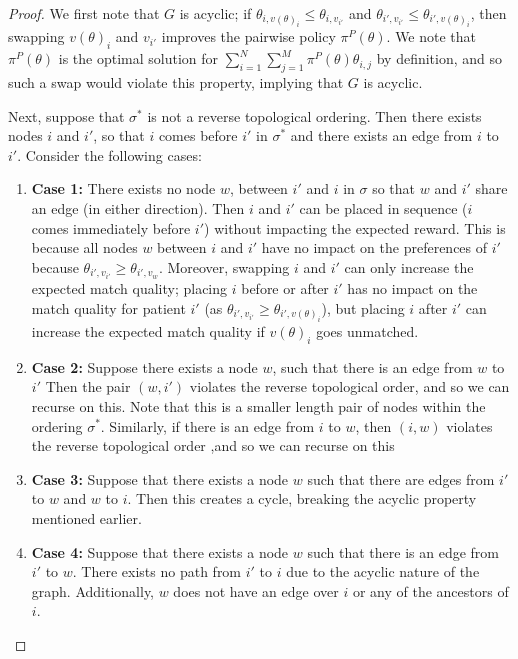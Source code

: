 \documentclass[11pt]{article}
\begin{document}
\thmordering*
\begin{proof}
We first note that $G$ is acyclic; if $\theta_{i,v(\theta)_{i}} \leq \theta_{i,v_{i'}}$ and $\theta_{i',v_{i'}} \leq \theta_{i',v(\theta)_{i}}$, then swapping $v(\theta)_{i}$ and $v_{i'}$ improves the pairwise policy $\pi^{P}(\theta)$. 
We note that $\pi^{P}(\theta)$ is the optimal solution for $\sum_{i=1}^{N} \sum_{j=1}^{M} \pi^{P}(\theta) \theta_{i,j}$ by definition, and so such a swap would violate this property, implying that $G$ is acyclic. 

Next, suppose that $\sigma^{*}$ is not a reverse topological ordering. 
Then there exists nodes $i$ and $i'$, so that $i$ comes before $i'$ in $\sigma^{*}$ and there exists an edge from $i$ to $i'$. 
Consider the following cases: 
\begin{enumerate}
    \item \textbf{Case 1:} There exists no node $w$, between $i'$ and $i$ in $\sigma$ so that $w$ and $i'$ share an edge (in either direction). 
    Then $i$ and $i'$ can be placed in sequence ($i$ comes immediately before $i'$) without impacting the expected reward. 
    This is because all nodes $w$ between $i$ and $i'$ have no impact on the preferences of $i'$ because $\theta_{i',v_{i'}} \geq \theta_{i',v_{w}}$. 
    Moreover, swapping $i$ and $i'$ can only increase the expected match quality; placing $i$ before or after $i'$ has no impact on the match quality for patient $i'$ (as $\theta_{i',v_{i'}} \geq \theta_{i',v(\theta)_{i}}$), but placing $i$ after $i'$ can increase the expected match quality if $v(\theta)_{i}$ goes unmatched. 
    \item \textbf{Case 2:} Suppose there exists a node $w$, such that there is an edge from $w$ to $i'$ Then the pair $(w,i')$ violates the reverse topological order, and so we can recurse on this. Note that this is a smaller length pair of nodes within the ordering $\sigma^{*}$. Similarly, if there is an edge from $i$ to $w$, then $(i,w)$ violates the reverse topological order ,and so we can recurse on this
    \item \textbf{Case 3:} Suppose that there exists a node $w$ such that there are edges from $i'$ to $w$ and $w$ to $i$. Then this creates a cycle, breaking the acyclic property mentioned earlier. 
    \item \textbf{Case 4:} Suppose that there exists a node $w$ such that there is an edge from $i'$ to $w$. There exists no path from $i'$ to $i$ due to the acyclic nature of the graph. 
    Additionally, $w$ does not have an edge over $i$ or any of the ancestors of $i$. 

\end{enumerate}
\end{proof}
\end{document}
